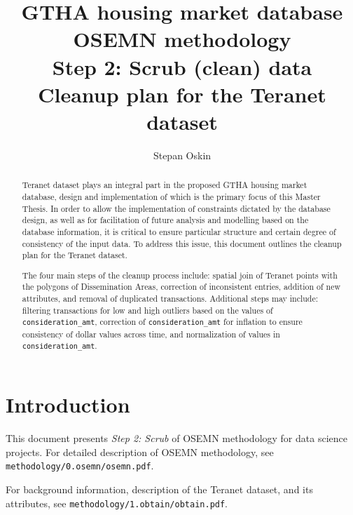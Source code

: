 \documentclass[11pt]{article}
\begin{document}
    \title{GTHA housing market database \\
    OSEMN methodology \\
    Step 2: Scrub (clean) data \\
    Cleanup plan for the Teranet dataset}

    \author{Stepan Oskin}

    \maketitle

    \begin{abstract}
        Teranet dataset plays an integral part in the proposed GTHA housing market database, design and implementation of which is the primary focus of this Master Thesis.
        In order to allow the implementation of constraints dictated by the database design, as well as for facilitation of future analysis and modelling based on the database information, it is critical to ensure particular structure and certain degree of consistency of the input data.
        To address this issue, this document outlines the cleanup plan for the Teranet dataset.

        The four main steps of the cleanup process include: spatial join of Teranet points with the polygons of Dissemination Areas, correction of inconsistent entries, addition of new attributes, and removal of duplicated transactions.
        Additional steps may include: filtering transactions for low and high outliers based on the values of \texttt{consideration\_amt}, correction of \texttt{consideration\_amt} for inflation to ensure consistency of dollar values across time, and normalization of values in \texttt{consideration\_amt}.
    \end{abstract}

    \section{Introduction} \label{sec:teranet_cleaning_intro}

    This document presents \textit{Step 2: Scrub} of OSEMN methodology for data science projects.
    For detailed description of OSEMN methodology, see \\ \texttt{methodology/0.osemn/osemn.pdf}.

    \vspace{5mm}

    For background information, description of the Teranet dataset, and its attributes, see \texttt{methodology/1.obtain/obtain.pdf}.
\end{document}
